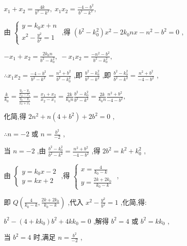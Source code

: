 \documentclass[10pt]{article}
\begin{document}
\({x}_{1} + {x}_{2} = \frac{4k}{{b}^{2} - {k}^{2}},\;{x}_{1}{x}_{2} = \frac{-4 - {b}^{2}}{{b}^{2} - {k}^{2}},\)

由 \(\left\{  \begin{array}{l} y = {k}_{0}x + n \\  {x}^{2} - \frac{{y}^{2}}{{b}^{2}} = 1 \end{array}\right.\) ,得 \(\left( {{b}^{2} - {k}_{0}^{2}}\right) {x}^{2} - 2{k}_{0}{nx} - {n}^{2} - {b}^{2} = 0\) ,

\(- {x}_{1} + {x}_{2} = \frac{2{k}_{0}n}{{b}^{2} - {k}_{0}^{2}},\; - {x}_{1}{x}_{2} = \frac{-{n}^{2} - {b}^{2}}{{b}^{2} - {k}_{0}^{2}},\)

\(\therefore {x}_{1}{x}_{2} = \frac{-4 - {b}^{2}}{{b}^{2} - {k}^{2}} = \frac{{n}^{2} + {b}^{2}}{{b}^{2} - {k}_{0}^{2}}\) ,即 \(\frac{{b}^{2} - {k}_{0}^{2}}{{b}^{2} - {k}^{2}}\) ,即 \(\frac{{b}^{2} - {k}_{0}^{2}}{{b}^{2} - {k}^{2}} = \frac{{n}^{2} + {b}^{2}}{-4 - {b}^{2}}\) ,

\(\frac{k}{{k}_{0}} = \frac{\frac{{y}_{2} - {y}_{1}}{{x}_{2} - {x}_{1}}}{\frac{{y}_{2} - {y}_{1}}{{x}_{2} + {x}_{1}}} = \frac{{x}_{1} + {x}_{2}}{{x}_{2} - {x}_{1}} = \frac{2k}{{k}_{0}n}\frac{{b}^{2} - {k}_{0}^{2}}{{b}^{2} - {k}^{2}} = \frac{2k}{{k}_{0}n}\frac{{n}^{2} + {b}^{2}}{-4 - {b}^{2}},\)

化简,得 \(2{n}^{2} + n\left( {4 + {b}^{2}}\right)  + 2{b}^{2} = 0\) ,

\(\therefore n =  - 2\) 或 \(n = \frac{{b}^{2}}{-2}\) ,

当 \(n =  - 2\) ,由 \(\frac{{b}^{2} - {k}_{0}^{2}}{{b}^{2} - {k}^{2}} = \frac{{n}^{2} + {b}^{2}}{-4 - {b}^{2}}\) ,得 \(2{b}^{2} = {k}^{2} + {k}_{0}^{2}\) ,

由 \(\left\{  \begin{array}{l} y = {k}_{0}x - 2 \\  y = {kx} + 2 \end{array}\right.\) ,得 \(\left\{  \begin{array}{l} x = \frac{4}{{k}_{0} - k} \\  y = \frac{{2k} + 2{k}_{0}}{{k}_{0} - k} \end{array}\right.\) ,

即 \(Q\left( {\frac{4}{{k}_{0} - k},\frac{{2k} + 2{k}_{0}}{{k}_{0} - k}}\right)\) ,代入 \({x}^{2} - \frac{{y}^{2}}{{b}^{2}} = 1\) ,化简,得:

\({b}^{2} - \left( {4 + k{k}_{0}}\right) {b}^{2} + {4k}{k}_{0} = 0\) ,解得 \({b}^{2} = 4\) 或 \({b}^{2} = k{k}_{0}\) ,

当 \({b}^{2} = 4\) 时,满足 \(n = \frac{{b}^{2}}{-2}\) ,
\end{document}
